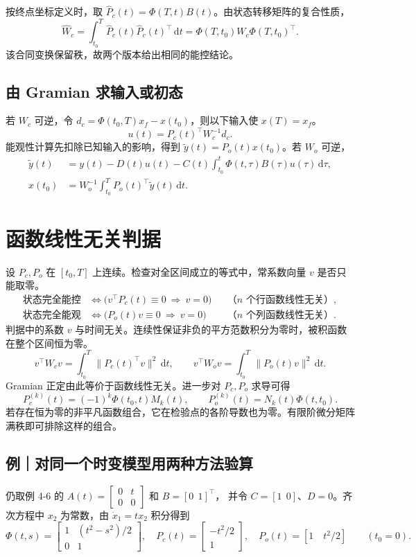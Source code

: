 \documentclass[UTF8,a4paper,12pt,fontset=fandol]{ctexart}
\newcommand{\dd}{\,\mathrm{d}}
\begin{document}
按终点坐标定义时，取 $\widehat P_c(t)=\Phi(T,t)B(t)$。由状态转移矩阵的复合性质，
\[
  \widehat W_c=\int_{t_0}^{T}\widehat P_c(t)\widehat P_c(t)^\top\dd t
  =\Phi(T,t_0)W_c\Phi(T,t_0)^\top .
\]
该合同变换保留秩，故两个版本给出相同的能控结论。

\subsection*{由 Gramian 求输入或初态}
若 $W_c$ 可逆，令 $d_c=\Phi(t_0,T)x_f-x(t_0)$，则以下输入使 $x(T)=x_f$。
\[
  u(t)=P_c(t)^\top W_c^{-1}d_c .
\]
能观性计算先扣除已知输入的影响，得到 $\widetilde y(t)=P_o(t)x(t_0)$。若 $W_o$ 可逆，
\[
\begin{aligned}
 \widetilde y(t)&=y(t)-D(t)u(t)-C(t)\int_{t_0}^{t}\Phi(t,\tau)B(\tau)u(\tau)\dd\tau,\\
 x(t_0)&=W_o^{-1}\int_{t_0}^{T}P_o(t)^\top\widetilde y(t)\dd t .
\end{aligned}
\]

\newpage
\section{函数线性无关判据}\label{sec:function}

设 $P_c,P_o$ 在 $[t_0,T]$ 上连续。检查对全区间成立的等式中，常系数向量 $v$ 是否只能取零。
\begin{align*}
 \text{状态完全能控}
    &\iff \bigl(v^\top P_c(t)\equiv 0\ \Longrightarrow\ v=0\bigr)
     &&\text{（$n$ 个行函数线性无关）},\\
 \text{状态完全能观}
    &\iff \bigl(P_o(t)v\equiv 0\ \Longrightarrow\ v=0\bigr)
     &&\text{（$n$ 个列函数线性无关）}.
\end{align*}
判据中的系数 $v$ 与时间无关。连续性保证非负的平方范数积分为零时，被积函数在整个区间恒为零。
\[
  v^\top W_cv=\int_{t_0}^{T}\lVert P_c(t)^\top v\rVert^2\dd t,
  \qquad
  v^\top W_ov=\int_{t_0}^{T}\lVert P_o(t)v\rVert^2\dd t .
\]
Gramian 正定由此等价于函数线性无关。进一步对 $P_c,P_o$ 求导可得
\[
  P_c^{(k)}(t)=(-1)^k\Phi(t_0,t)M_k(t),
  \qquad P_o^{(k)}(t)=N_k(t)\Phi(t,t_0) .
\]
若存在恒为零的非平凡函数组合，它在检验点的各阶导数也为零。有限阶微分矩阵满秩即可排除这样的组合。

\subsection*{例｜对同一个时变模型用两种方法验算}
仍取例 4-6 的 $A(t)=\begin{bmatrix}0&t\\0&0\end{bmatrix}$ 和 $B=[0\ \ 1]^\top$，
并令 $C=[1\ \ 0]$、$D=0$。齐次方程中 $x_2$ 为常数，由 $\dot x_1=tx_2$ 积分得到
\[
   \Phi(t,s)=\begin{bmatrix}1&(t^2-s^2)/2\\0&1\end{bmatrix},
   \quad P_c(t)=\begin{bmatrix}-t^2/2\\1\end{bmatrix},
   \quad P_o(t)=[1\quad t^2/2]\qquad (t_0=0).
\]
\end{document}
